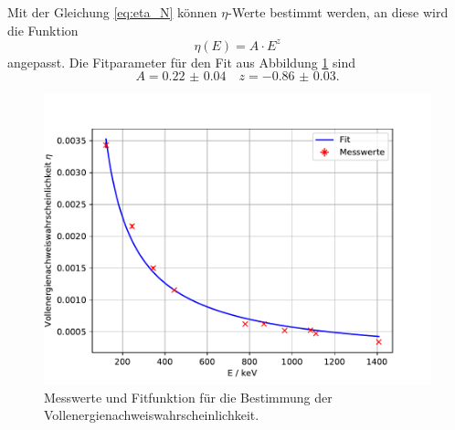 \FloatBarrier
Mit der Gleichung \eqref{eq:eta_N} können $\eta$-Werte bestimmt werden, an diese wird die Funktion 
\begin{equation*}
  \eta(E) = A\cdot E ^z
\end{equation*}
angepasst. 
Die Fitparameter für den Fit aus Abbildung \ref{fig:Vollenergienachweiswahrscheinlichkeit} sind 
\begin{equation*}
  A = \num{0.22(4)} \quad z = \num{-0.86(3)}.
\end{equation*}
\begin{figure}
  \centering
  \caption{Messwerte und Fitfunktion für die Bestimmung der Vollenergienachweiswahrscheinlichkeit.}
  \label{fig:Vollenergienachweiswahrscheinlichkeit}
  \includegraphics[width = \textwidth, keepaspectratio]{figure/Vollenergienachweiswahrscheinlichkeit.pdf}
\end{figure}
\FloatBarrier

